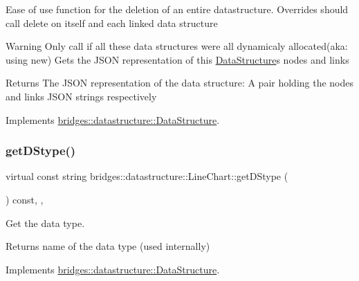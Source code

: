 Ease of use function for the deletion of an entire datastructure. Overrides should call delete on itself and each linked data structure

\begin{DoxyWarning}{Warning}
Only call if all these data structures were all dynamicaly allocated(aka\+: using new) Gets the J\+S\+ON representation of this \mbox{\hyperlink{classbridges_1_1datastructure_1_1_data_structure}{Data\+Structure}}\textquotesingle{}s nodes and links
\end{DoxyWarning}
\begin{DoxyReturn}{Returns}
The J\+S\+ON representation of the data structure\+: A pair holding the nodes and links J\+S\+ON strings respectively 
\end{DoxyReturn}


Implements \mbox{\hyperlink{classbridges_1_1datastructure_1_1_data_structure}{bridges\+::datastructure\+::\+Data\+Structure}}.

\mbox{\label{classbridges_1_1datastructure_1_1_line_chart_a431e49c31cdd5f46e978742776306dfa}} 
\subsubsection{\texorpdfstring{get\+D\+Stype()}{getDStype()}}
{\footnotesize\ttfamily virtual const string bridges\+::datastructure\+::\+Line\+Chart\+::get\+D\+Stype (\begin{DoxyParamCaption}{ }\end{DoxyParamCaption}) const\hspace{0.3cm}{\ttfamily [inline]}, {\ttfamily [override]}, {\ttfamily [virtual]}}



Get the data type. 

\begin{DoxyReturn}{Returns}
name of the data type (used internally) 
\end{DoxyReturn}


Implements \mbox{\hyperlink{classbridges_1_1datastructure_1_1_data_structure_a4ff66cb34409f11fe9fc647f6d8a22ce}{bridges\+::datastructure\+::\+Data\+Structure}}.

\mbox{\label{classbridges_1_1datastructure_1_1_line_chart_a07a4424d4bbc1cdd15cef3e2c0f0c075}} 

